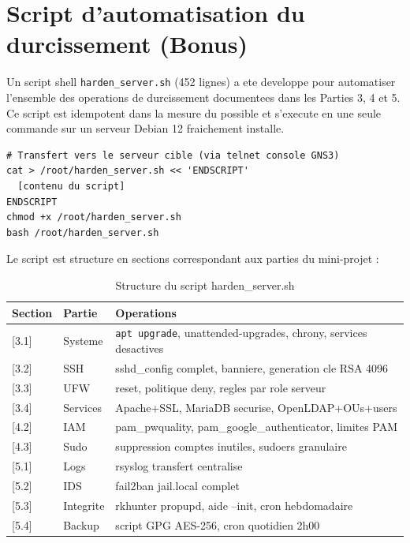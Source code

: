 \documentclass[11pt,a4paper]{article}
\begin{document}
\section{Script d'automatisation du durcissement (Bonus)}
\label{sec:script}

Un script shell \texttt{harden\_server.sh} (452 lignes) a ete developpe pour automatiser l'ensemble des operations de durcissement documentees dans les Parties 3, 4 et 5. Ce script est idempotent dans la mesure du possible et s'execute en une seule commande sur un serveur Debian 12 fraichement installe.

\begin{lstlisting}[caption={Utilisation du script}]
# Transfert vers le serveur cible (via telnet console GNS3)
cat > /root/harden_server.sh << 'ENDSCRIPT'
  [contenu du script]
ENDSCRIPT
chmod +x /root/harden_server.sh
bash /root/harden_server.sh
\end{lstlisting}

Le script est structure en sections correspondant aux parties du mini-projet :

\begin{table}[H]
\centering
\begin{tabular}{@{}lll@{}}
\toprule
\textbf{Section} & \textbf{Partie} & \textbf{Operations} \\
\midrule
{[3.1]} & Systeme & \texttt{apt upgrade}, unattended-upgrades, chrony, services desactives \\
{[3.2]} & SSH & sshd\_config complet, banniere, generation cle RSA 4096 \\
{[3.3]} & UFW & reset, politique deny, regles par role serveur \\
{[3.4]} & Services & Apache+SSL, MariaDB securise, OpenLDAP+OUs+users \\
{[4.2]} & IAM & pam\_pwquality, pam\_google\_authenticator, limites PAM \\
{[4.3]} & Sudo & suppression comptes inutiles, sudoers granulaire \\
{[5.1]} & Logs & rsyslog transfert centralise \\
{[5.2]} & IDS & fail2ban jail.local complet \\
{[5.3]} & Integrite & rkhunter propupd, aide --init, cron hebdomadaire \\
{[5.4]} & Backup & script GPG AES-256, cron quotidien 2h00 \\
\bottomrule
\end{tabular}
\caption{Structure du script harden\_server.sh}
\label{tab:script}
\end{table}
\end{document}
